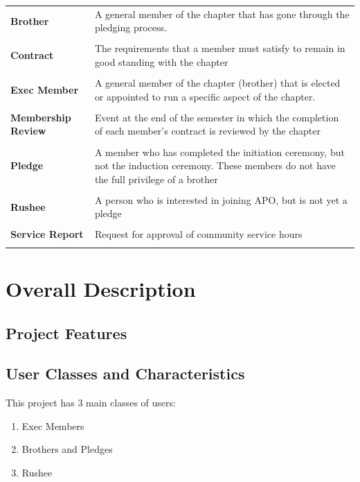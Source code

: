 \documentclass{article}
\begin{document}
\begin{longtable}{lp{8cm}}

{\bf Brother} & A general member of the chapter that has gone through
the pledging process. \\ \\
{\bf Contract} & The requirements that a member must satisfy to remain
in good standing with the chapter \\ \\
{\bf Exec Member} & A general member of the chapter (brother) that is
elected or appointed to run a specific aspect of the chapter. \\ \\
{\bf Membership Review} & Event at the end of the semester in which
the completion of each member's contract is reviewed by the chapter\\ \\
{\bf Pledge} & A member who has completed the initiation ceremony, but
not the induction ceremony. These members do not have the full
privilege of a brother\\ \\
{\bf Rushee} & A person who is interested in joining APO, but is not
yet a pledge \\ \\
{\bf Service Report} & Request for approval of community service hours
\\ \\

\end{longtable}

\section{Overall Description}

\subsection{Project Features}

\subsection{User Classes and Characteristics}

This project has 3 main classes of users:

\begin{enumerate}
  \item Exec Members
  \item Brothers and Pledges
  \item Rushee
\end{enumerate}
\end{document}
